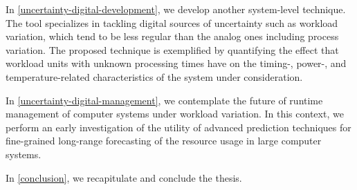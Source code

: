 In \cref{uncertainty-digital-development}, we develop another system-level
technique. The tool specializes in tackling digital sources of uncertainty such
as workload variation, which tend to be less regular than the analog ones
including process variation. The proposed technique is exemplified by
quantifying the effect that workload units with unknown processing times have on
the timing-, power-, and temperature-related characteristics of the system under
consideration.

In \cref{uncertainty-digital-management}, we contemplate the future of runtime
management of computer systems under workload variation. In this context, we
perform an early investigation of the utility of advanced prediction techniques
for fine-grained long-range forecasting of the resource usage in large computer
systems.

In \cref{conclusion}, we recapitulate and conclude the thesis.
